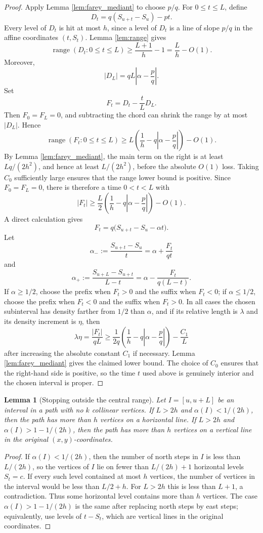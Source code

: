\documentclass[11pt]{article}
\newtheorem{lemma}[theorem]{Lemma}
\theoremstyle{definition}
\theoremstyle{remark}
\newcommand{\range}{\operatorname{range}}
\newcommand{\1}{\mathbf 1}
\begin{document}
\begin{proof}
Apply Lemma \ref{lem:farey_mediant} to choose $p/q$. For $0\le t\le L$, define
\[
D_t=q(S_{u+t}-S_u)-pt.
\]
Every level of $D_t$ is hit at most $h$, since a level of $D_t$ is a line of slope $p/q$ in the affine coordinates $(t,S_t)$. Lemma \ref{lem:range} gives
\[
\range(D_t:0\le t\le L)\ge \frac{L+1}{h}-1=\frac Lh-O(1).
\]
Moreover,
\[
|D_L|=qL\left|\alpha-\frac pq\right|.
\]
Set
\[
F_t=D_t-\frac{t}{L}D_L.
\]
Then $F_0=F_L=0$, and subtracting the chord can shrink the range by at most $|D_L|$. Hence
\[
\range(F_t:0\le t\le L)
\ge L\left(\frac1h-q\left|\alpha-\frac pq\right|\right)-O(1).
\]
By Lemma \ref{lem:farey_mediant}, the main term on the right is at least $Lq/(2h^2)$, and hence at least $L/(2h^2)$, before the absolute $O(1)$ loss.  Taking $C_0$ sufficiently large ensures that the range lower bound is positive.  Since $F_0=F_L=0$, there is therefore a time $0<t<L$ with
\[
|F_t|\ge \frac L2\left(\frac1h-q\left|\alpha-\frac pq\right|\right)-O(1).
\]
A direct calculation gives
\[
F_t=q\bigl(S_{u+t}-S_u-\alpha t\bigr).
\]
Let
\[
\alpha_-:=\frac{S_{u+t}-S_u}{t}=\alpha+\frac{F_t}{qt}
\]
and
\[
\alpha_+:=\frac{S_{u+L}-S_{u+t}}{L-t}=\alpha-\frac{F_t}{q(L-t)}.
\]
If $\alpha\ge1/2$, choose the prefix when $F_t>0$ and the suffix when $F_t<0$; if $\alpha\le1/2$, choose the prefix when $F_t<0$ and the suffix when $F_t>0$. In all cases the chosen subinterval has density farther from $1/2$ than $\alpha$, and if its relative length is $\lambda$ and its density increment is $\eta$, then
\[
\lambda\eta=\frac{|F_t|}{qL}
\ge \frac1{2q}\left(\frac1h-q\left|\alpha-\frac pq\right|\right)-\frac{C_1}{L}
\]
after increasing the absolute constant $C_1$ if necessary.  Lemma \ref{lem:farey_mediant} gives the claimed lower bound.  The choice of $C_0$ ensures that the right-hand side is positive, so the time $t$ used above is genuinely interior and the chosen interval is proper.
\end{proof}

\begin{lemma}[Stopping outside the central range]\label{lem:stop}
Let $I=[u,u+L]$ be an interval in a path with no $k$ collinear vertices. If $L>2h$ and $\alpha(I)<1/(2h)$, then the path has more than $h$ vertices on a horizontal line. If $L>2h$ and $\alpha(I)>1-1/(2h)$, then the path has more than $h$ vertices on a vertical line in the original $(x,y)$-coordinates.
\end{lemma}

\begin{proof}
If $\alpha(I)<1/(2h)$, then the number of north steps in $I$ is less than $L/(2h)$, so the vertices of $I$ lie on fewer than $L/(2h)+1$ horizontal levels $S_t=c$. If every such level contained at most $h$ vertices, the number of vertices in the interval would be less than $L/2+h$. For $L>2h$ this is less than $L+1$, a contradiction. Thus some horizontal level contains more than $h$ vertices. The case $\alpha(I)>1-1/(2h)$ is the same after replacing north steps by east steps; equivalently, use levels of $t-S_t$, which are vertical lines in the original coordinates.
\end{proof}
\end{document}
